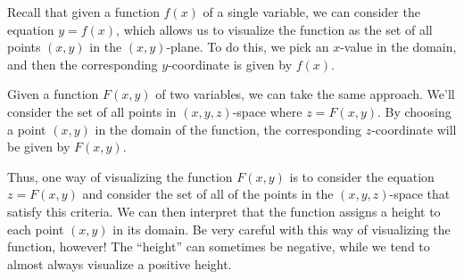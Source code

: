 \documentclass{ximera}
\begin{document}
Recall that given a function $f(x)$ of a single variable, we can
consider the equation $y=f(x)$, which allows us to visualize the
function as the set of all points $(x,y)$ in the $(x,y)$-plane.  To do
this, we pick an $x$-value in the domain, and then the corresponding
$y$-coordinate is given by $f(x)$.


Given a function $F(x,y)$ of two variables, we can take the same
approach.  We'll consider the set of all points in $(x,y,z)$-space
where $z=F(x,y)$.  By choosing a point $(x,y)$ in the domain of the
function, the corresponding $z$-coordinate will be given by $F(x,y)$.
\begin{image}
\end{image}

Thus, one way of visualizing the function $F(x,y)$ is to consider the
equation $z=F(x,y)$ and consider the set of all of the points in the $(x,y,z)$-space
that satisfy this criteria.  We can then interpret that the function assigns a
height to each point $(x,y)$ in its domain.  Be very careful with this way 
of visualizing the function, however!  The ``height'' can sometimes be 
negative, while we tend to almost always visualize a positive height.  
\end{document}
